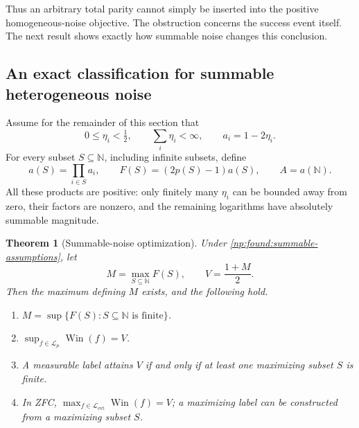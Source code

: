 \documentclass[11pt,a4paper]{article}
\newtheorem{theorem}{Theorem}[section]
\theoremstyle{definition}
\theoremstyle{remark}
\newcommand{\N}{\mathbb N}
\newcommand{\Win}{\operatorname{Win}}
\begin{document}
Thus an arbitrary total parity cannot simply be inserted into the
positive homogeneous-noise objective.  The obstruction concerns the
success event itself.  The next result shows exactly how summable noise
changes this conclusion.

\subsection{An exact classification for summable heterogeneous noise}

Assume for the remainder of this section that
\begin{equation}
 0\le\eta_i<\tfrac12,
 \qquad \sum_i\eta_i<\infty,
 \qquad a_i=1-2\eta_i.
 \label{np:found:summable-assumptions}
\end{equation}
For every subset $S\subseteq\N$, including infinite subsets, define
\begin{equation}
 a(S)=\prod_{i\in S}a_i,
 \qquad F(S)=(2p(S)-1)a(S),
 \qquad A=a(\N).
 \label{np:found:compact-objective}
\end{equation}
All these products are positive: only finitely many $\eta_i$ can be
bounded away from zero, their factors are nonzero, and the remaining
logarithms have absolutely summable magnitude.

\begin{theorem}[Summable-noise optimization]
\label{np:found:summable-theorem}
Under \eqref{np:found:summable-assumptions}, let
\[
 M=\max_{S\subseteq\N}F(S),\qquad V=\frac{1+M}{2}.
\]
Then the maximum defining $M$ exists, and the following hold.
\begin{enumerate}
 \item $M=\sup\{F(S):S\subseteq\N\text{ is finite}\}$.
 \item $\sup_{f\in\mathcal L_{\mu}}\Win(f)=V$.
 \item A measurable label attains $V$ if and only if at least one
 maximizing subset $S$ is finite.
 \item In ZFC, $\max_{f\in\mathcal L_{\mathrm{evt}}}\Win(f)=V$; a maximizing
 label can be constructed from a maximizing subset $S$.
\end{enumerate}
\end{theorem}
\end{document}
